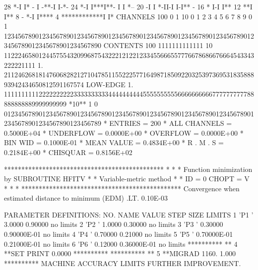 \begin{Listing}
       28                        *-I                       I* - I -**-I                              I-*-
       24                       *-I                         I***I**- I                                I *--
       20                      -I                             I *-II-I                                I-I** -
       16                      *                              I-I                                         I**
       12                    **I                                                                            I**
        8                 - *-I                                                                               I****
        4       ************I                                                                                     I*
 CHANNELS 100   0                                                                                                  1   
           10   0        1         2         3         4         5         6         7         8         9         0   
            1   1234567890123456789012345678901234567890123456789012345678901234567890123456789012345678901234567890   
 CONTENTS 100                          1111111111111                                                                
           10                 112224658012445755432099687543222121221233455666557776678686676664543343222221111     
            1.       21124626818147606828212710478511552225771649871850922032539736953183588893942434650812591167574
 LOW-EDGE   1.            111111111122222222223333333333444444444455555555556666666666777777777788888888889999999999
 *10**  1   0   0123456789012345678901234567890123456789012345678901234567890123456789012345678901234567890123456789
 * ENTRIES =        200      * ALL CHANNELS = 0.5000E+04      * UNDERFLOW = 0.0000E+00      * OVERFLOW = 0.0000E+00
 * BIN WID = 0.1000E-01      * MEAN VALUE   = 0.4834E+00      * R . M . S = 0.2184E+00
 * CHISQUAR  =  0.8156E+02
\newpage
{\scriptsize
     **********************************************
     *                                            *
     * Function minimization by SUBROUTINE HFITV  *
     * Variable-metric method                     *
     * ID =          0  CHOPT = V                 *
     *                                            *
     **********************************************
 Convergence when estimated distance to minimum (EDM) .LT.  0.10E-03

 PARAMETER DEFINITIONS:
    NO.   NAME         VALUE      STEP SIZE      LIMITS
     1 'P1        '    3.0000      0.90000         no limits
     2 'P2        '    1.0000      0.30000         no limits
     3 'P3        '   0.30000      0.90000E-01     no limits
     4 'P4        '   0.70000      0.21000         no limits
     5 'P5        '   0.70000E-01  0.21000E-01     no limits
     6 'P6        '   0.12000      0.36000E-01     no limits
 **********
 **    4 **SET PRINT  0.0000    
 **********
 **********
 **    5 **MIGRAD   1160.       1.000    
 **********
 MACHINE ACCURACY LIMITS FURTHER IMPROVEMENT.

}
\end{Listing}

